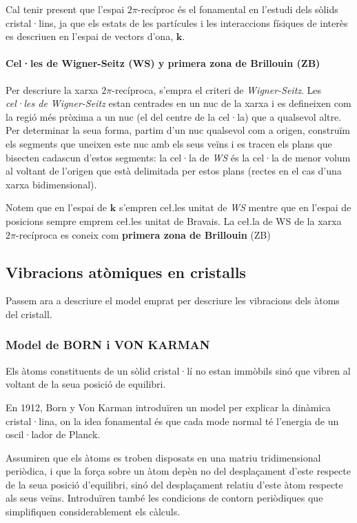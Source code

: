 \documentclass[12pt]{article} %
\let\vec\mathbf %
\begin{document}
Cal tenir present que l'espai $2\pi$-recíproc és el fonamental en l'estudi dels sòlids cristal·lins, ja que els estats de les partícules i les interaccions físiques de interès es descriuen en l'espai de vectors d'ona, $\vec k$.


\paragraph{Cel·les de Wigner-Seitz (WS) y primera zona de Brillouin (ZB)}

Per descriure la xarxa $2\pi$-recíproca, s'empra el criteri de \textit{Wigner-Seitz}. Les \textit{cel·les de Wigner-Seitz} estan centrades en un nuc de la xarxa i es defineixen com la regió més pròxima a un nuc (el del centre de la cel·la) que a qualsevol altre. Per determinar la seua forma, partim d'un nuc qualsevol com a origen, construïm els segments que uneixen este nuc amb els seus veïns i es tracen els plans que bisecten cadascun d'estos segments: la cel·la de \emph{WS} és la cel·la de menor volum al voltant de l'origen que està delimitada per estos plans (rectes en el cas d'una xarxa bidimensional).

Notem que en l'espai de $\vec k$ s'empren ce\l.les unitat de \emph{WS} mentre que en l'espai de posicions sempre emprem ce\l.les unitat de Bravais.
La ce\l.la de WS de la xarxa $2\pi$-recíproca es coneix com \textbf{primera zona de Brillouin} (ZB)


\subsection{Vibracions atòmiques en cristalls}
Passem ara a descriure el model emprat per descriure les vibracions dels àtoms del cristall.
\subsubsection{Model de BORN i VON KARMAN}
Els àtoms constituents de un sòlid cristal·lí no estan immòbils sinó que vibren al voltant de la seua posició de equilibri.

En 1912, Born y Von Karman \cite{Born:1912:SRG} introduïren un model per explicar la dinàmica cristal·lina, on la idea fonamental és que cada mode normal té l'energia de un oscil·lador de Planck.

Assumiren que els àtoms es troben disposats en una matriu tridimensional periòdica, i que la força sobre un àtom depèn no del desplaçament d'este respecte de la seua posició d'equilibri, sinó del desplaçament relatiu d'este àtom respecte als seus veïns. Introduïren també les condicions de contorn periòdiques que simplifiquen considerablement els càlculs. 
 
\end{document}
